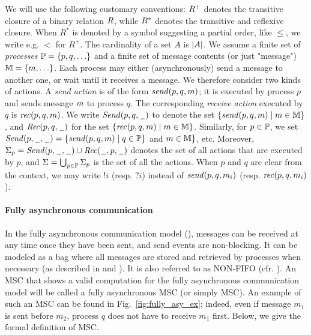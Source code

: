 We will use the following customary conventions:  $\mathbin{R}^+$ denotes the transitive closure of a binary relation $\mathbin{R}$, while $\mathbin{R}^*$ denotes the transitive and reflexive closure. When $R^*$ is denoted by a symbol suggesting 
a partial order, like $\leq$, we write e.g. 
$<$ for $R^+$.  The cardinality of a set $A$ is  $| A |$.
%
We assume a finite set of \emph{processes} $\mathbb{P}=\{p,q,\ldots\}$ and a finite set of message contents (or just "message") $\mathbb{M}=\{m,\ldots\}$.
Each process may either (asynchronously) send a message to another one, or wait until it receives a message.
We therefore consider two kinds of actions. A \emph{send action} is of the form $\mathit{send}(p, q, m)$;
it is executed by process $p$ and sends message $m$ to process $q$.
The corresponding \emph{receive action} executed by $q$ is $\mathit{rec}(p, q, m)$.
%
We write ${\mathit{Send}(p,q,\hspace{0.1em}\underline{\hspace{0.5em}}\hspace{0.1em})}$ to denote the set $\{\mathit{send}(p, q, m) \mid m \in \mathbb{M}\}$, and
${\mathit{Rec}(p,q,\hspace{0.1em}\underline{\hspace{0.5em}}\hspace{0.1em})}$ for the set $\{\mathit{rec}(p, q, m) \mid m \in \mathbb{M}\}$.
Similarly, for $p \in \mathbb{P}$, we set
${\mathit{Send}(p,\hspace{0.1em}\underline{\hspace{0.5em}}\hspace{0.1em},\hspace{0.1em}\underline{\hspace{0.5em}}\hspace{0.1em})} = \{\mathit{send}(p, q, m) \mid q \in \mathbb{P}
\}$ and $m \in \mathbb{M}\}$, etc.
Moreover, $\Sigma_{p} = {\mathit{Send}(p,\hspace{0.1em}\underline{\hspace{0.5em}}\hspace{0.1em},\hspace{0.1em}\underline{\hspace{0.5em}}\hspace{0.1em})} \cup {\mathit{Rec}(\hspace{0.1em}\underline{\hspace{0.5em}}\hspace{0.1em},p,\hspace{0.1em}\underline{\hspace{0.5em}}\hspace{0.1em})}$ denotes the set of all actions that are
executed by $p$, and $\Sigma = \bigcup_{p \in \mathbb{P}} \Sigma_{p}$
is the set of all the actions. When $p$ and $q$
are clear from the context, we may write $!i$ (resp. $?i$) instead of $\mathit{send}(p, q, m_i)$ (resp. $\mathit{rec}(p, q, m_i)$).


\paragraph{\bf Fully asynchronous communication}
In the fully asynchronous communication model (\asy), messages can be received at any time once they have been sent, and send events are non-blocking.
It can be modeled as a bag where all messages are stored and retrieved by processes when necessary (as described in \cite{DBLP:journals/fac/ChevrouHQ16} and \cite{DBLP:journals/tcs/BasuB16}).
It is also referred to as NON-FIFO (cfr.  \cite{DBLP:journals/dc/Charron-BostMT96}).
An MSC that shows a valid computation for the fully asynchronous communication model will be called a fully asynchronous MSC (or simply MSC). An example of such an MSC can be found in Fig.~\ref{fig:fully_asy_ex}; indeed, even if message $m_1$ is sent before $m_2$, process $q$ does not have to receive $m_1$ first. Below, we give the formal definition of MSC.

